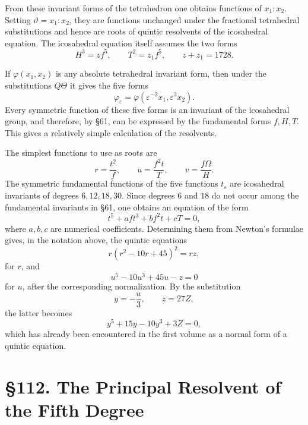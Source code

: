 \documentclass[11pt,a4paper]{book}
\newcommand{\webersection}[2]{\clearpage\section*{\S #1. #2}}
\newcommand{\omegaT}{\Omega}
\begin{document}
From these invariant forms of the tetrahedron one obtains functions of $x_1:x_2$.  Setting $\vartheta=x_1:x_2$, they are functions unchanged under the fractional tetrahedral substitutions and hence are roots of quintic resolvents of the icosahedral equation.  The icosahedral equation itself assumes the two forms
\begin{equation}
 H^3=zf^5,
 \qquad
 T^2=z_1f^5,
 \qquad z+z_1=1728.
\end{equation}

If $\varphi(x_1,x_2)$ is any absolute tetrahedral invariant form, then under the substitutions $Q\Theta$ it gives the five forms
\begin{equation}
 \varphi_\varepsilon=\varphi(\varepsilon^{-2}x_1,
\varepsilon^2x_2).
\end{equation}
Every symmetric function of these five forms is an invariant of the icosahedral group, and therefore, by \S 61, can be expressed by the fundamental forms $f,H,T$.  This gives a relatively simple calculation of the resolvents.

The simplest functions to use as roots are
\begin{equation}
 r=\frac{t^2}{f},
 \qquad
 u=\frac{f^2t}{T},
 \qquad
 v=\frac{f\omegaT}{H}.
\end{equation}
The symmetric fundamental functions of the five functions $t_\varepsilon$ are icosahedral invariants of degrees $6,12,18,30$.  Since degrees $6$ and $18$ do not occur among the fundamental invariants in \S 61, one obtains an equation of the form
\begin{equation}
 t^5+af t^3+bf^2t+cT=0,
\end{equation}
where $a,b,c$ are numerical coefficients.  Determining them from Newton's formulae gives, in the notation above, the quintic equations
\begin{equation}
 r(r^2-10r+45)^2=rz,
\end{equation}
for $r$, and
\begin{equation}
 u^5-10u^3+45u-z=0
\end{equation}
for $u$, after the corresponding normalization.  By the substitution
\[
 y=-\frac{u}{3},
 \qquad z=27Z,
\]
the latter becomes
\begin{equation}
 y^5+15y-10y^3+3Z=0,
\end{equation}
which has already been encountered in the first volume as a normal form of a quintic equation.

\webersection{112}{The Principal Resolvent of the Fifth Degree}
\end{document}
